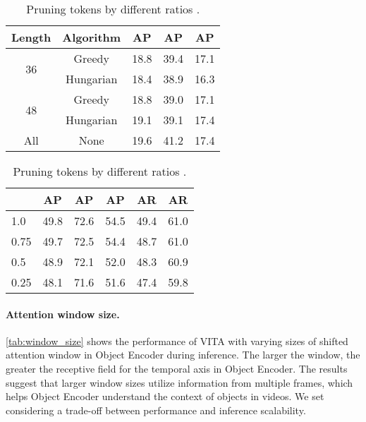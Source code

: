 \documentclass{article}
\begin{document}
\begin{table}
    \begin{minipage}[t]{0.48\textwidth}
        \vspace{-9mm}
        \centering
        \caption{
            Use of different heuristic association algorithms on OVIS \texttt{valid} set.
        }
{
        \begin{tabular}{@{}c|c|ccc@{}}
            \toprule
            Length               & Algorithm            & AP    & AP & AP\\
            \midrule
            \midrule
            \multirow{2}{*}{36}  & Greedy               & 18.8  & 39.4      & 17.1\\
                                 & Hungarian            & 18.4  & 38.9      & 16.3\\
            \midrule
            \multirow{2}{*}{48}  & Greedy               & 18.8  & 39.0      & 17.1\\
                                 & Hungarian            & 19.1  & 39.1      & 17.4\\
            \midrule
            All                  & None                 & 19.6  & 41.2      & 17.4\\
            \bottomrule
        \end{tabular}
        }
        \label{tab:clip_matching}
    \end{minipage}
    \hfill
    \begin{minipage}[t]{0.48\linewidth}
        \centering
        \vspace{2.3mm}
        \caption{Pruning tokens by different ratios .}
        \begin{tabular}{@{}l|ccccc@{}}
        \toprule
                 & AP    & AP & AP & AR  & AR \\
        \midrule
        \midrule
        1.0         & 49.8  & 72.6      & 54.5      & 49.4      & 61.0      \\
        0.75        & 49.7  & 72.5      & 54.4      & 48.7      & 61.0      \\
        0.5         & 48.9  & 72.1      & 52.0      & 48.3      & 60.9      \\
        0.25        & 48.1  & 71.6      & 51.6      & 47.4      & 59.8      \\
        \bottomrule
        \end{tabular}
        \label{tab:pruning}
    \end{minipage}
    \hfill
\end{table} 

\paragraph{Attention window size.}
\cref{tab:window_size} shows the performance of VITA with varying sizes of shifted attention window  in Object Encoder during inference.
The larger the window, the greater the receptive field for the temporal axis in Object Encoder.
The results suggest that larger window sizes utilize information from multiple frames, which helps Object Encoder understand the context of objects in videos.
We set  considering a trade-off between performance and inference scalability.
\end{document}
